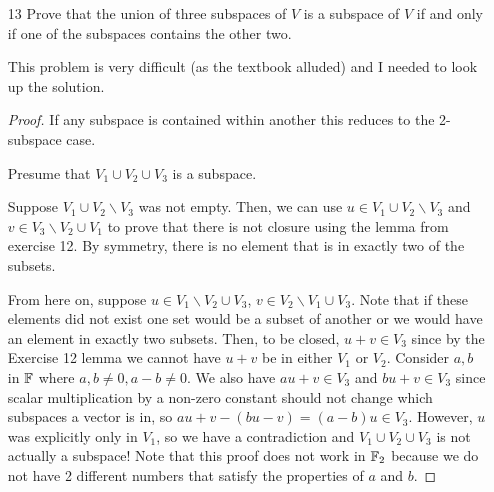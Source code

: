 \begin{enumerate}
\begin{proof}
        Consider WLOG $V_1 \subseteq V_2$. Then, $V_1 \cup V_2 = V_2$, and since $V_2$ is a subspace so is $V_1 \cup V_2$.

        The converse is trickier. We prove the contrapositive. Consider when $V_1$ and $V_2$ are not subsets of each other. Then, there is some element $u \in V_1, u \not \in V_2$. There must also be an element $v \in V_2, v \not \in V_1$. These are true from the definition of subset. Consider $u + v$. By the lemma, this sum is in neither set, so it is not in the union of $V_1$ and $V_2$, so $V_1 \cup V_2$ is not a subspace.

    \end{proof}

    \item[13] Prove that the union of three subspaces of \(V\) is a subspace of \(V\) if and only if one of the subspaces contains the other two.
    
    This problem is very difficult (as the textbook alluded) and I needed to look up the solution.
    
    \begin{proof}
        If any subspace is contained within another this reduces to the 2-subspace case. 

        Presume that $V_1 \cup V_2 \cup V_3$ is a subspace. 

        Suppose $V_1 \cup V_2 \backslash V_3$ was not empty. Then, we can use $u \in V_1 \cup V_2 \backslash V_3$ and $v \in V_3 \backslash V_2 \cup V_1$ to prove that there is not closure using the lemma from exercise 12. By symmetry, there is no element that is in exactly two of the subsets. 

        From here on, suppose $u \in V_1 \backslash V_2 \cup V_3$, $v \in V_2 \backslash V_1 \cup V_3$. Note that if these elements did not exist one set would be a subset of another or we would have an element in exactly two subsets. Then, to be closed, $u + v \in V_3$ since by the Exercise 12 lemma we cannot have $u + v$ be in either $V_1$ or $V_2$. Consider $a, b$ in $\mathbb{F}$ where $a, b \neq 0, a - b \neq 0$. We also have $au + v \in V_3$ and $bu + v \in V_3$ since scalar multiplication by a non-zero constant should not change which subspaces a vector is in, so $au + v - (bu - v) = (a-b)u \in V_3$. However, $u$ was explicitly only in $V_1$, so we have a contradiction and $V_1 \cup V_2 \cup V_3$ is not actually a subspace! Note that this proof does not work in $\mathbb{F}_2$ because we do not have 2 different numbers that satisfy the properties of $a$ and $b$. 
    \end{proof}


\end{enumerate}
